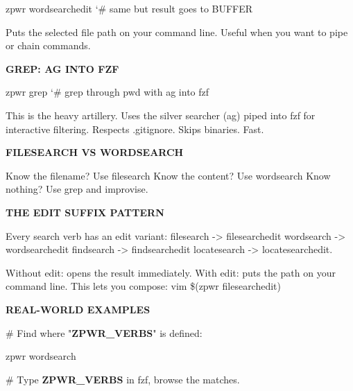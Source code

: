 \documentclass[11pt,a4paper,twoside]{book}
\begin{document}
\begin{codebox}
\color{neongreen}zpwr wordsearchedit      {\char`\#} same but result goes to BUFFER\\
\end{codebox}

Puts the selected file path on your command line. Useful when you want to pipe or chain commands.


\vspace{12pt}
{\bfseries\color{neonyellow} GREP: AG INTO FZF}\vspace{4pt}

\begin{codebox}
\color{neongreen}zpwr grep               {\char`\#} grep through pwd with ag into fzf\\
\end{codebox}

This is the heavy artillery. Uses the silver searcher (ag) piped into fzf for interactive filtering. Respects .gitignore. Skips binaries. Fast.


\vspace{12pt}
{\bfseries\color{neonyellow} FILESEARCH VS WORDSEARCH}\vspace{4pt}

Know the filename?     Use filesearch Know the content?      Use wordsearch Know nothing?          Use grep and improvise.


\vspace{12pt}
{\bfseries\color{neonyellow} THE EDIT SUFFIX PATTERN}\vspace{4pt}

Every search verb has an edit variant: filesearch     -> filesearchedit wordsearch     -> wordsearchedit findsearch     -> findsearchedit locatesearch   -> locatesearchedit.

Without edit: opens the result immediately. With edit: puts the path on your command line. This lets you compose: vim \$(zpwr filesearchedit)


\vspace{12pt}
{\bfseries\color{neonyellow} REAL-WORLD EXAMPLES}\vspace{4pt}

\# Find where "\textbf{ZPWR\_VERBS}" is defined:

\begin{codebox}
\color{neongreen}zpwr wordsearch\\
\end{codebox}

\# Type \textbf{ZPWR\_VERBS} in fzf, browse the matches.
\end{document}
